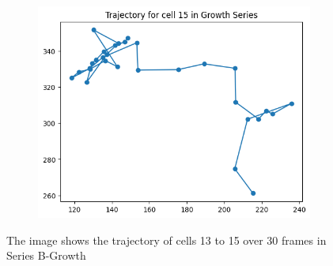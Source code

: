 \documentclass{article}
\begin{document}
\begin{figure}[h!]
    \begin{subfigure}[b]{0.5\linewidth}
        \centering
        \includegraphics[width=\linewidth]{Report/Appendix_Images/Trajectory-B-Growth/trajectory_15.png}
    \end{subfigure}
    \caption{The image shows the trajectory of cells 13 to 15 over 30 frames in Series B-Growth}
    \label{fig:Trajectory-GrowthSeries-13-15}
\end{figure}
\end{document}
